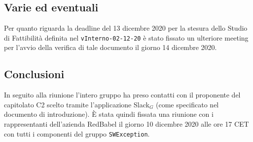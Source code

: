 	\subsection{Varie ed eventuali}
	Per quanto riguarda la deadline del 13 dicembre 2020 per la stesura dello Studio di Fattibilità definita nel \verb|vInterno-02-12-20| è stato fissato un ulteriore meeting per l'avvio della verifica di tale documento il giorno 14 dicembre 2020.
	
	\subsection{Conclusioni}
	In seguito alla riunione l'intero gruppo ha preso contatti con il proponente del capitolato C2 scelto tramite l'applicazione Slack$_G$ (come specificato nel documento di introduzione). È stata quindi fissata una riunione con i rappresentanti dell'azienda RedBabel il giorno 10 dicembre 2020 alle ore 17 CET con tutti i componenti del gruppo \verb|SWException|.
	